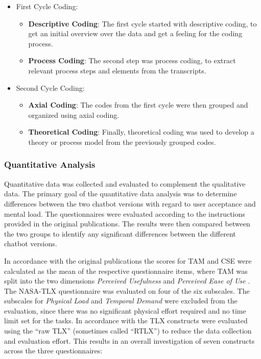 \begin{itemize}
    \item First Cycle Coding:
    \begin{itemize}
        \item \textbf{Descriptive Coding}: The first cycle started with descriptive coding, to get an initial overview over the data and get a feeling for the coding process.
        \item \textbf{Process Coding}: The second step was process coding, to extract relevant process steps and elements from the transcripts.
    \end{itemize}
    \item Second Cycle Coding:
    \begin{itemize}
        \item \textbf{Axial Coding}: The codes from the first cycle were then grouped and organized using axial coding.
        \item \textbf{Theoretical Coding}: Finally, theoretical coding was used to develop a theory or process model from the previously grouped codes.
    \end{itemize}
\end{itemize}

\subsubsection{Quantitative Analysis} \label{sssec:quantitative_analysis}

Quantitative data was collected and evaluated to complement the qualitative data. The primary goal of the quantitative data analysis was to determine differences between the two chatbot versions with regard to user acceptance and mental load. The questionnaires were evaluated according to the instructions provided in the original publications. The results were then compared between the two groups to identify any significant differences between the different chatbot versions.

In accordance with the original publications the scores for TAM and CSE were calculated as the mean of the respective questionnaire items, where TAM was split into the two dimensions \textit{Perceived Usefulness} and \textit{Perceived Ease of Use} \parencite{Davis1989,Compeau1995}. The \acs{NASA}-\ac{TLX} questionnaire was evaluated on four of the six subscales. The subscales for \textit{Physical Load} and \textit{Temporal Demand} were excluded from the evaluation, since there was no significant physical effort required and no time limit set for the tasks. In accordance with \cite{Hart2006} the \ac{TLX} constructs were evaluated using the “raw TLX” (sometimes called “RTLX”) to reduce the data collection and evaluation effort. This results in an overall investigation of seven constructs across the three questionnaires:

